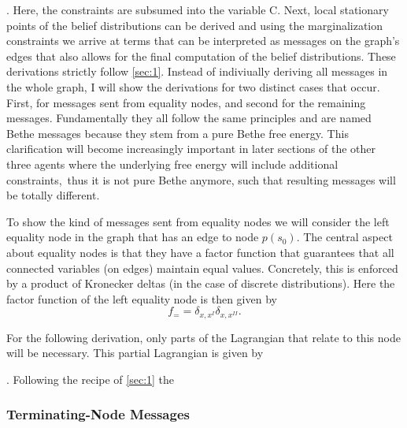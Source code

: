 .
Here, the constraints are subsumed into the variable C.
Next, local stationary points of the belief distributions can be derived and using the marginalization constraints we arrive at terms that can be interpreted as messages on the graph's edges that also allows for the final computation of the belief distributions.
These derivations strictly follow \cref{sec:1}. Instead of indiviually deriving all messages in the whole graph, I will show the derivations for two distinct cases that occur. First, for messages sent from equality nodes, and second for the remaining messages. Fundamentally they all follow the same principles and are named Bethe messages because they stem from a pure Bethe free energy. This clarification will become increasingly important in later sections of the other three agents where the underlying free energy will include additional constraints, thus it is not pure Bethe anymore, such that resulting messages will be totally different.

To show the kind of messages sent from equality nodes we will consider the left equality node in the graph that has an edge to node \(p(s_0)\). The central aspect about equality nodes is that they have a factor function that guarantees that all connected variables (on edges) maintain equal values. Concretely, this is enforced by a product of Kronecker deltas (in the case of discrete distributions). Here the factor function of the left equality node is then given by
\begin{equation}
    f_= = \delta_{x,x^{\scriptscriptstyle I}} \delta_{x,x^{\scriptscriptstyle II}}.
\end{equation}


For the following derivation, only parts of the Lagrangian that relate to this node will be necessary. This partial Lagrangian is given by

.
Following the recipe of \cref{sec:1} the


\subsubsection{Terminating-Node Messages}

